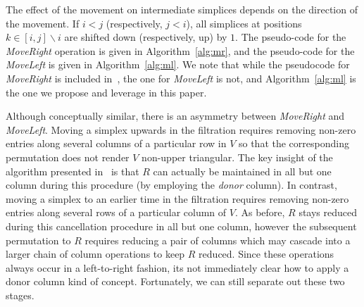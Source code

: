 \documentclass{siamart190516}
\begin{document}
\noindent The effect of the movement on intermediate simplices depends on the direction of the movement. If $i < j$ (respectively, $j < i$), all simplices at positions $k \in [i,j] \smallsetminus i$ are shifted down (respectively, up) by $1$. 
The pseudo-code for the \emph{MoveRight} operation is given in Algorithm~\ref{alg:mr}, and the pseudo-code for the \emph{MoveLeft} is given in Algorithm~\ref{alg:ml}. 
We note that while the pseudocode for \emph{MoveRight} is included in~\cite{busaryev2010tracking}, the one for \emph{MoveLeft} is not, and Algorithm~\ref{alg:ml} is the one we propose and leverage in this paper.

Although conceptually similar, there is an asymmetry between \emph{MoveRight} and \emph{MoveLeft}. Moving a simplex upwards in the filtration requires removing non-zero entries along several columns of a particular row in $V$ so that the corresponding permutation does not render $V$ non-upper triangular. The key insight of the algorithm presented in~\cite{busaryev2010tracking} is that $R$ can actually be maintained in all but one column during this procedure (by employing the \emph{donor} column). In contrast, moving a simplex to an earlier time in the filtration requires removing non-zero entries along several rows of a particular column of $V$. As before, $R$ stays reduced during this cancellation procedure in all but one column, however the subsequent permutation to $R$ requires reducing a pair of columns which may cascade into a larger chain of column operations to keep $R$ reduced. Since these operations always occur in a left-to-right fashion, its not immediately clear how to apply a donor column kind of concept. Fortunately, we can still separate out these two stages. 
\end{document}
